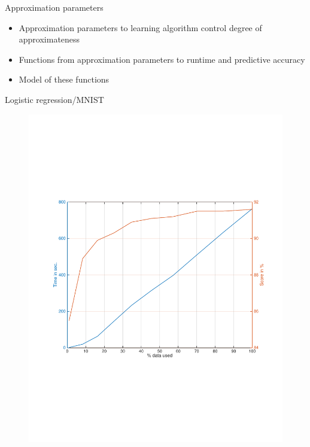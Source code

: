 \documentclass[handout]{beamer}
\begin{document}
\begin{frame}{Approximation parameters}
\begin{itemize}
\item<1-> Approximation parameters to learning algorithm control degree of approximateness
\item<2-> Functions from approximation parameters to runtime and predictive accuracy
\item<3-> Model of these functions
\end{itemize}
\end{frame}

\begin{frame}{Logistic regression/MNIST}
\begin{figure}
  \centering
  \includegraphics[trim=50 200 35 205,clip,width=.75\linewidth]{lr_mnist.pdf}
  \caption{}
  \label{sampledata1}	
\end{figure}
\end{frame}
\end{document}
